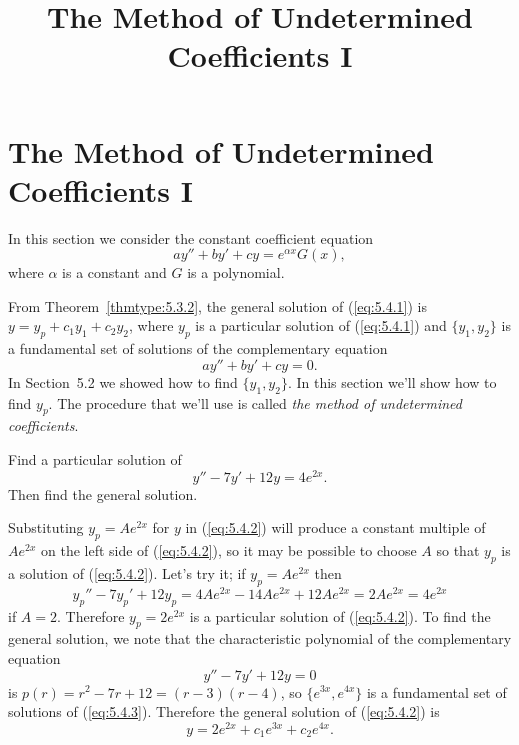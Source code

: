\documentclass{ximera}
\title{The Method of Undetermined Coefficients I}
\begin{document}
\begin{abstract}

\end{abstract}

\maketitle

\section*{The Method of Undetermined Coefficients I}

In this section we consider the constant coefficient equation
\begin{equation} \label{eq:5.4.1}
ay''+by'+cy=e^{\alpha x}G(x),
\end{equation}
where $\alpha$ is a constant and $G$ is a polynomial.


From Theorem~\ref{thmtype:5.3.2}, the general solution of (\ref{eq:5.4.1})
is
$y=y_p+c_1y_1+c_2y_2$, where $y_p$ is a particular solution of
(\ref{eq:5.4.1}) and $\{y_1,y_2\}$ is a fundamental set of
solutions of the complementary equation
$$
ay''+by'+cy=0.
$$
In Section~5.2 we showed how to find $\{y_1,y_2\}$. In this
section we'll show how to find $y_p$. The procedure that we'll use
is called \textit{the method of undetermined coefficients}.


\begin{example}\label{example:5.4.1}
Find a particular solution of
\begin{equation} \label{eq:5.4.2}
y''-7y'+12y=4e^{2x}.
\end{equation}
Then find the general solution.


\begin{explanation}
Substituting $y_p=Ae^{2x}$ for $y$ in (\ref{eq:5.4.2}) will produce a
constant multiple of $Ae^{2x}$ on the left side of (\ref{eq:5.4.2}), so it
may be possible to choose $A$ so that $y_p$ is a solution of
(\ref{eq:5.4.2}). Let's try it;   if $y_p=Ae^{2x}$ then
$$
y_p''-7y_p'+12y_p=4Ae^{2x}-14Ae^{2x}+12Ae^{2x}=2Ae^{2x}=4e^{2x}
$$
if $A=2$. Therefore $y_p=2e^{2x}$ is a particular solution of
(\ref{eq:5.4.2}). To find the general solution, we note that the
characteristic polynomial of the complementary equation
\begin{equation} \label{eq:5.4.3}
y''-7y'+12y=0
\end{equation}
is $p(r)=r^2-7r+12=(r-3)(r-4)$, so $\{e^{3x},e^{4x}\}$ is a
fundamental set of solutions of (\ref{eq:5.4.3}). Therefore the general
solution of (\ref{eq:5.4.2}) is
$$
 y=2e^{2x}+c_1e^{3x}+c_2e^{4x}.
$$

\end{explanation}
\end{example}
\end{document}
